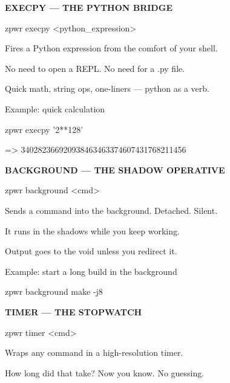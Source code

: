 \documentclass[11pt,a4paper,twoside]{book}
\begin{document}
\vspace{12pt}
{\bfseries\color{neonyellow} EXECPY — THE PYTHON BRIDGE}\vspace{4pt}

\begin{codebox}
zpwr execpy <python\_expression>\\
\end{codebox}

Fires a Python expression from the comfort of your shell.

No need to open a REPL. No need for a .py file.

Quick math, string ops, one-liners — python as a verb.

Example: quick calculation

\begin{codebox}
zpwr execpy '2**128'\\
\end{codebox}

=> 340282366920938463463374607431768211456


\vspace{12pt}
{\bfseries\color{neonyellow} BACKGROUND — THE SHADOW OPERATIVE}\vspace{4pt}

\begin{codebox}
zpwr background <cmd>\\
\end{codebox}

Sends a command into the background. Detached. Silent.

It runs in the shadows while you keep working.

Output goes to the void unless you redirect it.

Example: start a long build in the background

\begin{codebox}
zpwr background make -j8\\
\end{codebox}


\vspace{12pt}
{\bfseries\color{neonyellow} TIMER — THE STOPWATCH}\vspace{4pt}

\begin{codebox}
zpwr timer <cmd>\\
\end{codebox}

Wraps any command in a high-resolution timer.

How long did that take? Now you know. No guessing.
\end{document}
